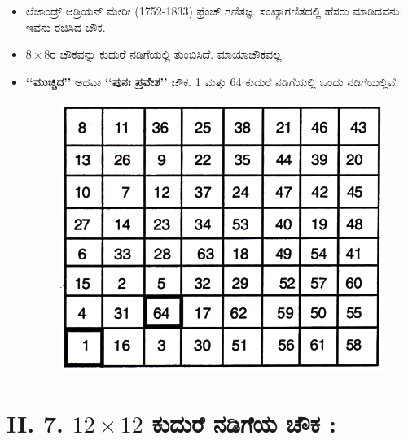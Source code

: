 \begin{itemize}
	\item ಲೆಜಾಂಡ್ರ್ ಆಡ್ರಿಯನ್ ಮೇರೀ (1752-1833) ಫ್ರೆಂಚ್ ಗಣಿತಜ್ಞ. ಸಂಖ್ಯಾಗಣಿತದಲ್ಲಿ ಹೆಸರು ಮಾಡಿದವನು. ಇವನು ರಚಿಸಿದ ಚೌಕ.
	\item $8 \times 8$ರ ಚೌಕವನ್ನು ಕುದುರೆ ನಡಿಗೆಯಲ್ಲಿ ತುಂಬಿಸಿದೆ. ಮಾಯಾಚೌಕವಲ್ಲ.
	\item \textbf{‘‘ಮುಚ್ಚಿದ’’} ಅಥವಾ  \textbf{‘‘ಪುನಃ ಪ್ರವೇಶ’’} ಚೌಕ. 1 ಮತ್ತು 64 ಕುದುರೆ ನಡಿಗೆಯಲ್ಲಿ ಒಂದು ನಡಿಗೆಯಲ್ಲಿವೆ.
	\begin{figure}[H]
	\includegraphics{src/figures/chap6/fig6.9.jpg}
	\end{figure}
\end{itemize}

\section*{II. 7. $12 \times 12$ ಕುದುರೆ ನಡಿಗೆಯ ಚೌಕ :}

